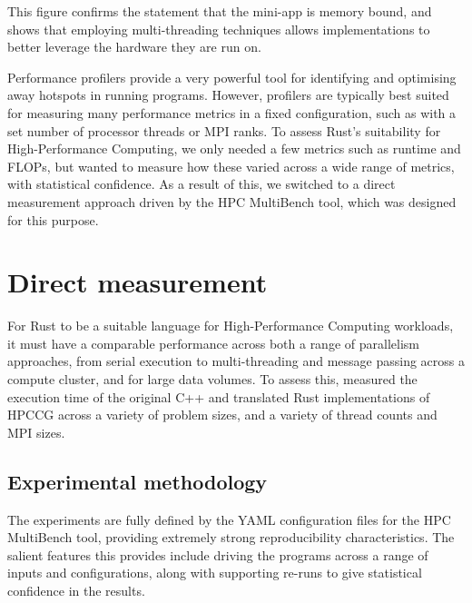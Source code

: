 This figure confirms the statement that the mini-app is memory bound, and shows that employing multi-threading techniques allows implementations to better leverage the hardware they are run on.

Performance profilers provide a very powerful tool for identifying and optimising away hotspots in running programs. However, profilers are typically best suited for measuring many performance metrics in a fixed configuration, such as with a set number of processor threads or MPI ranks. To assess Rust's suitability for High-Performance Computing, we only needed a few metrics such as runtime and FLOPs, but wanted to measure how these varied across a wide range of metrics, with statistical confidence. As a result of this, we switched to a direct measurement approach driven by the HPC MultiBench tool, which was designed for this purpose.

\section{Direct measurement}
\label{sec:direct-measurement}

For Rust to be a suitable language for High-Performance Computing workloads, it must have a comparable performance across both a range of parallelism approaches, from serial execution to multi-threading and message passing across a compute cluster, and for large data volumes. To assess this, measured the execution time of the original C++ and translated Rust implementations of HPCCG across a variety of problem sizes, and a variety of thread counts and MPI sizes.

\subsection{Experimental methodology}
\label{ssec:experimental-methodology}


The experiments are fully defined by the YAML configuration files for the HPC MultiBench tool, providing extremely strong reproducibility characteristics. The salient features this provides include driving the programs across a range of inputs and configurations, along with supporting re-runs to give statistical confidence in the results.

